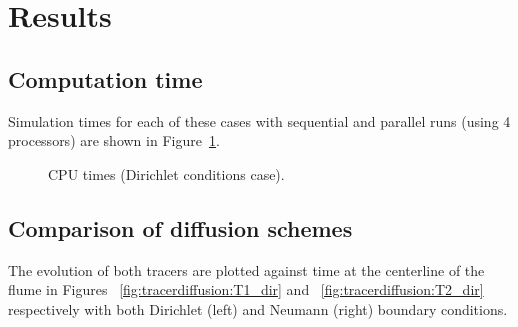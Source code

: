 \section{Results}

\subsection{Computation time}

Simulation times for each of these cases with sequential and parallel runs
(using 4 processors) are shown in Figure~\ref{fig:tracerdiffusion:cputime}.

\begin{figure}[H]
  \centering
  \caption{CPU times (Dirichlet conditions case).}
  \label{fig:tracerdiffusion:cputime}
\end{figure}

\subsection{Comparison of diffusion schemes}

The evolution of both tracers are plotted against time at the centerline of the flume
in Figures ~\ref{fig:tracerdiffusion:T1_dir} and ~\ref{fig:tracerdiffusion:T2_dir}
respectively with both Dirichlet (left) and Neumann (right) boundary conditions.

